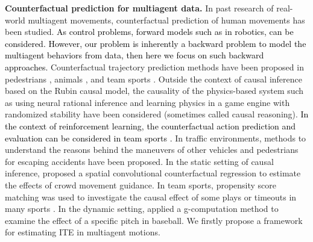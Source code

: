 \documentclass[journal]{IEEEtran}
\begin{document}
\noindent\textbf{Counterfactual prediction for multiagent data.}
In past research of real-world multiagent movements, counterfactual prediction of human movements has been studied.
\textcolor{black}{As control problems, forward models such as in robotics, can be considered. However, our problem is inherently a backward problem to model the multiagent behaviors from data, then here we focus on such backward approaches.}
Counterfactual trajectory prediction methods have been proposed in pedestrians \cite{chen2021human}, animals \cite{fujii2021learning}, and team sports \cite{Yeh19,Fujii20policy,nakahara2022estimating,teranishi2022evaluation}.
Outside the context of causal inference based on the Rubin causal model, the causality of the physics-based system such as using neural rational inference \cite{Kipf18} and learning physics in a game engine with randomized stability \cite{lerer2016learning} have been considered (sometimes called causal reasoning).
\textcolor{black}{In the context of reinforcement learning, the counterfactual action prediction and evaluation can be considered in team sports \cite{Liu2018,Liu2020,rahimian2022beyond,nakahara2023action}.}
In traffic environments, 
methods to understand the reasons behind the maneuvers of other vehicles and pedestrians for escaping accidents \cite{ramanishka2018toward, you2020traffic,mcduff2021causalcity} have been proposed.
In the static setting of causal inference, \cite{takeuchi2021grab} proposed a spatial convolutional counterfactual regression to estimate the effects of crowd movement guidance. %
In team sports, propensity score matching was used to investigate the causal effect of some plays or timeouts in many sports \cite{yam2019lost,toumi2019grapes,gibbs2020causal,nakahara2022pitching}.
In the dynamic setting, \cite{vock2018estimating} applied a g-computation method to examine the effect of a specific pitch in baseball. %
We firstly propose a framework for estimating ITE in multiagent motions. %
\end{document}
